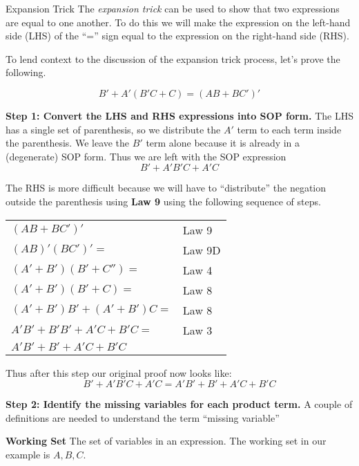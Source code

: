 \begin{process}{Expansion Trick}
\label{process:representationsExpansionTrick}
The \textit{expansion trick} can be used to show that two expressions are 
equal to one another.  To do this we will make the expression on the 
left-hand side (LHS) of the ``='' sign equal to the expression on the
right-hand side (RHS).  

To lend context to the discussion of the expansion trick process, let's prove 
the following.

\begin{equation}
\label{equ:representationsBullDozerStep0}
B' + A'(B'C + C) = (AB + BC')'
\end{equation}

\textbf{Step 1: Convert the LHS and RHS expressions into SOP form.}
The LHS has a single set of parenthesis, so we distribute the $A'$ term to each
term inside the parenthesis.  We leave the $B'$ term alone because it is already
in a (degenerate) SOP form.  Thus we are left with the SOP expression 
$$B' + A'B'C + A'C$$

The RHS is more difficult because we will have to ``distribute'' the negation outside the 
parenthesis using \textbf{Law 9} using the following sequence of steps.

\begin{tabular}[ht]{ll}
 $(AB + BC')'$ 					& Law 9	\\ 
 $(AB)' (BC')'=$					& Law 9D 	\\ 
 $(A' + B') (B' + C'') =$			& Law 4 	\\ 
 $(A' + B') (B' + C) =$				& Law 8 	\\ 
 $(A' + B') B' + (A' + B') C =$		& Law 8 	\\ 
$A'B' + B'B' + A'C + B'C =$		& Law 3 	\\ 
$A'B' + B' + A'C + B'C $				&  	\\ 
\end{tabular}

Thus after this step our original proof now looks like:
\begin{equation}
\label{equ:representationsBullDozerStep1}
B' + A'B'C + A'C = A'B' + B' + A'C  + B'C 
\end{equation}

\textbf{Step 2: Identify the missing variables for each product term.}
A couple of definitions are needed to understand the term ``missing variable''

   \tabitem \textbf{Working Set} The set of variables in an expression. The working set in our example is ${A, B, C}$.
   

\end{process}
